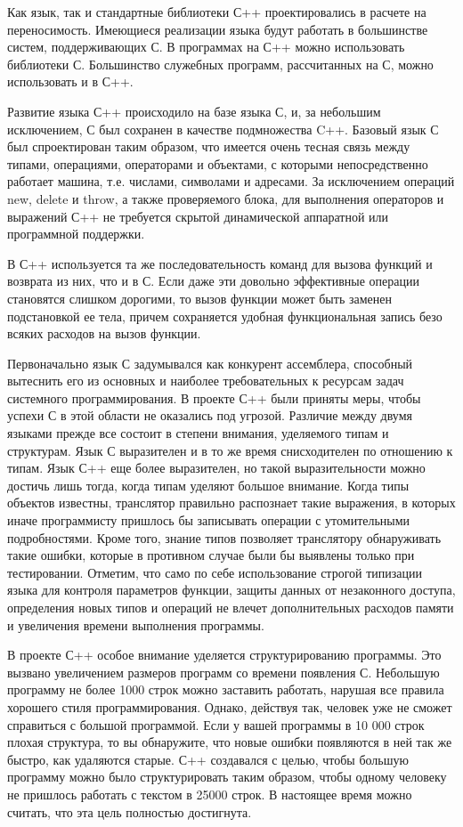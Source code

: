 Как язык, так и стандартные библиотеки С++ проектировались в расчете на переносимость. Имеющиеся реализации языка будут работать в большинстве систем, поддерживающих С. В программах на С++ можно использовать библиотеки С. Большинство служебных программ, рассчитанных на С, можно использовать и в С++.

Развитие языка С++ происходило на базе языка С, и, за небольшим исключением, С был сохранен в качестве подмножества C++. Базовый язык С был спроектирован таким образом, что имеется очень тесная связь между типами, операциями, операторами и объектами, с которыми непосредственно работает машина, т.е. числами, символами и адресами. За исключением операций new, delete и throw, а также проверяемого блока, для выполнения операторов и выражений С++ не требуется скрытой динамической аппаратной или программной поддержки.

В С++ используется та же последовательность команд для вызова функций и возврата из них, что и в С. Если даже эти довольно эффективные операции становятся слишком дорогими, то вызов функции может быть заменен подстановкой ее тела, причем сохраняется удобная функциональная запись безо всяких расходов на вызов функции.

Первоначально язык С задумывался как конкурент ассемблера, способный вытеснить его из основных и наиболее требовательных к ресурсам задач системного программирования. В проекте С++ были приняты меры, чтобы успехи С в этой области не оказались под угрозой. Различие между двумя языками прежде все состоит в степени внимания, уделяемого типам и структурам. Язык С выразителен и в то же время снисходителен по отношению к типам. Язык С++ еще более выразителен, но такой выразительности можно достичь лишь тогда, когда типам уделяют большое внимание. Когда типы объектов известны, транслятор правильно распознает такие выражения, в которых иначе программисту пришлось бы записывать операции с утомительными подробностями. Кроме того, знание типов позволяет транслятору обнаруживать такие ошибки, которые в противном случае были бы выявлены только при тестировании. Отметим, что само по себе использование строгой типизации языка для контроля параметров функции, защиты данных от незаконного доступа, определения новых типов и операций не влечет дополнительных расходов памяти и увеличения времени выполнения программы.

В проекте С++ особое внимание уделяется структурированию программы. Это вызвано увеличением размеров программ со времени появления С. Небольшую программу не более 1000 строк можно заставить работать, нарушая все правила хорошего стиля программирования. Однако, действуя так, человек уже не сможет справиться с большой программой. Если у вашей программы в 10 000 строк плохая структура, то вы обнаружите, что новые ошибки появляются в ней так же быстро, как удаляются старые. С++ создавался с целью, чтобы большую программу можно было
структурировать таким образом, чтобы одному человеку не пришлось работать с текстом в 25000 строк. В настоящее время можно считать, что эта цель полностью достигнута.

